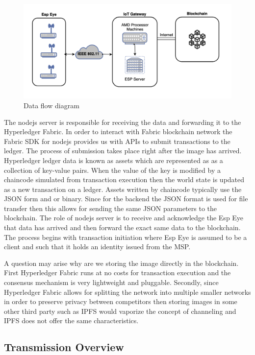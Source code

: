 \begin{figure}[!htb]
    \centering
    \includegraphics[width=1\textwidth]{figures/dataflow.png}
    \caption{Data flow diagram}
    \label{fig:dataflow}
\end{figure}
The nodejs server is responsible for receiving the data and forwarding it to the Hyperledger Fabric. 
In order to interact with Fabric blockchain network the Fabric SDK for nodejs provides us with APIs to submit transactions to the ledger. The process of submission takes place right after the image has arrived. Hyperledger ledger data is known as assets which are represented as as a collection of key-value pairs. When the value of the key is modified by a chaincode simulated from transaction execution then the world state is updated as a new transaction on a ledger. Assets written by chaincode typically use the JSON form and or binary. Since for the backend the JSON format is used for file transfer then this allows for sending the same JSON parameters to the blockchain. The role of nodejs server is to receive and acknowledge the Esp Eye that data has arrived and then forward the exact same data to the blockchain. The process begins with transaction initiation where Esp Eye is assumed to be a client and such that it holds an identity issued from the MSP. 

A question may arise why are we storing the image directly in the blockchain. First Hyperledger Fabric runs at no costs for transaction execution and the consensus mechanism is very lightweight and pluggable. Secondly, since Hyperledger Fabric allows for splitting the network into multiple smaller networks in order to preserve privacy between competitors then storing images in some other third party such as IPFS would vaporize the concept of channeling and IPFS does not offer the same characteristics. 


\subsection{Transmission Overview}
